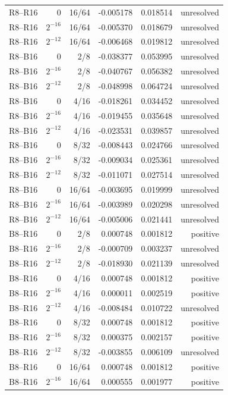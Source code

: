 {\begin{longtable}{lrrrrr}
R8--R16 & $0$ & 16/64 & -0.005178 & 0.018514 & unresolved \\
R8--R16 & $2^{-16}$ & 16/64 & -0.005370 & 0.018679 & unresolved \\
R8--R16 & $2^{-12}$ & 16/64 & -0.006468 & 0.019812 & unresolved \\
R8--B16 & $0$ & 2/8 & -0.038377 & 0.053995 & unresolved \\
R8--B16 & $2^{-16}$ & 2/8 & -0.040767 & 0.056382 & unresolved \\
R8--B16 & $2^{-12}$ & 2/8 & -0.048998 & 0.064724 & unresolved \\
R8--B16 & $0$ & 4/16 & -0.018261 & 0.034452 & unresolved \\
R8--B16 & $2^{-16}$ & 4/16 & -0.019455 & 0.035648 & unresolved \\
R8--B16 & $2^{-12}$ & 4/16 & -0.023531 & 0.039857 & unresolved \\
R8--B16 & $0$ & 8/32 & -0.008443 & 0.024766 & unresolved \\
R8--B16 & $2^{-16}$ & 8/32 & -0.009034 & 0.025361 & unresolved \\
R8--B16 & $2^{-12}$ & 8/32 & -0.011071 & 0.027514 & unresolved \\
R8--B16 & $0$ & 16/64 & -0.003695 & 0.019999 & unresolved \\
R8--B16 & $2^{-16}$ & 16/64 & -0.003989 & 0.020298 & unresolved \\
R8--B16 & $2^{-12}$ & 16/64 & -0.005006 & 0.021441 & unresolved \\
B8--R16 & $0$ & 2/8 & 0.000748 & 0.001812 & positive \\
B8--R16 & $2^{-16}$ & 2/8 & -0.000709 & 0.003237 & unresolved \\
B8--R16 & $2^{-12}$ & 2/8 & -0.018930 & 0.021139 & unresolved \\
B8--R16 & $0$ & 4/16 & 0.000748 & 0.001812 & positive \\
B8--R16 & $2^{-16}$ & 4/16 & 0.000011 & 0.002519 & positive \\
B8--R16 & $2^{-12}$ & 4/16 & -0.008484 & 0.010722 & unresolved \\
B8--R16 & $0$ & 8/32 & 0.000748 & 0.001812 & positive \\
B8--R16 & $2^{-16}$ & 8/32 & 0.000375 & 0.002157 & positive \\
B8--R16 & $2^{-12}$ & 8/32 & -0.003855 & 0.006109 & unresolved \\
B8--R16 & $0$ & 16/64 & 0.000748 & 0.001812 & positive \\
B8--R16 & $2^{-16}$ & 16/64 & 0.000555 & 0.001977 & positive \\

\end{longtable}}
